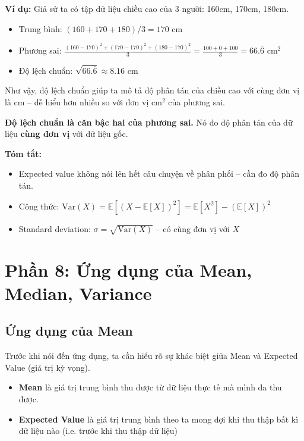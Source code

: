 \documentclass[11pt]{article}
\begin{document}
\vspace{1em}
\textbf{Ví dụ:}  
Giả sử ta có tập dữ liệu chiều cao của 3 người: 160cm, 170cm, 180cm.
\begin{itemize}
    \item Trung bình: $(160 + 170 + 180)/3 = 170$ cm
    \item Phương sai: $\frac{(160 - 170)^2 + (170 - 170)^2 + (180 - 170)^2}{3} = \frac{100 + 0 + 100}{3} = 66.\bar{6}$ cm$^2$
    \item Độ lệch chuẩn: $\sqrt{66.\bar{6}} \approx 8.16$ cm
\end{itemize}

Như vậy, độ lệch chuẩn giúp ta mô tả độ phân tán của chiều cao với cùng đơn vị là cm – dễ hiểu hơn nhiều so với đơn vị cm$^2$ của phương sai.

\vspace{1em}
\begin{tcolorbox}[colback=yellow!5!white,colframe=yellow!60!black,title=Ghi nhớ]
\textbf{Độ lệch chuẩn là căn bậc hai của phương sai.}  
Nó đo độ phân tán của dữ liệu \textbf{cùng đơn vị} với dữ liệu gốc.
\end{tcolorbox}

\vspace{1em}
\begin{summarybox}
    \textbf{Tóm tắt:}
    \begin{itemize}
        \item Expected value không nói lên hết câu chuyện về phân phối – cần đo độ phân tán.
        \item Công thức: $\text{Var}(X) = \mathbb{E}[(X - \mathbb{E}[X])^2] = \mathbb{E}[X^2] - (\mathbb{E}[X])^2$
        \item Standard deviation: $\sigma = \sqrt{\text{Var}(X)}$ – có cùng đơn vị với $X$
    \end{itemize}
\end{summarybox}


\section{Phần 8: Ứng dụng của Mean, Median, Variance}
\subsection{Ứng dụng của Mean}

Trước khi nói đến ứng dụng, ta cần hiểu rõ sự khác biệt giữa Mean và Expected Value (giá trị kỳ vọng).

\begin{itemize}
    \item \textbf{Mean} là giá trị trung bình thu được từ dữ liệu thực tế mà mình đa thu được.
    \item \textbf{Expected Value} là giá trị trung bình theo ta mong đợi khi thu thập bất kì dữ liệu nào (i.e. trước khi thu thập dữ liệu) 
\end{itemize}
\end{document}
